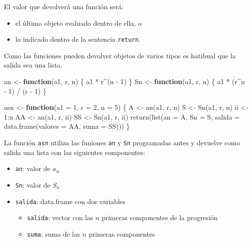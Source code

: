 \documentclass[
]{book}
\newenvironment{Shaded}{\begin{snugshade}}{\end{snugshade}}
\newcommand{\AttributeTok}[1]{\textcolor[rgb]{0.77,0.63,0.00}{#1}}
\newcommand{\ControlFlowTok}[1]{\textcolor[rgb]{0.13,0.29,0.53}{\textbf{#1}}}
\newcommand{\DecValTok}[1]{\textcolor[rgb]{0.00,0.00,0.81}{#1}}
\newcommand{\FunctionTok}[1]{\textcolor[rgb]{0.00,0.00,0.00}{#1}}
\newcommand{\NormalTok}[1]{#1}
\newcommand{\OtherTok}[1]{\textcolor[rgb]{0.56,0.35,0.01}{#1}}
\newcommand{\SpecialCharTok}[1]{\textcolor[rgb]{0.00,0.00,0.00}{#1}}
\providecommand{\tightlist}{%
  \setlength{\itemsep}{0pt}\setlength{\parskip}{0pt}}
\theoremstyle{break}
\begin{document}
El valor que devolverá una función será:

\begin{itemize}
\item
  el último objeto evaluado dentro de ella, o
\item
  lo indicado dentro de la sentencia \texttt{return}.
\end{itemize}

Como las funciones pueden devolver objetos de varios tipos es hatibual
que la salida sea una lista.

\begin{Shaded}
\begin{Highlighting}[]
\NormalTok{an }\OtherTok{\textless{}{-}} \ControlFlowTok{function}\NormalTok{(a1, r, n) \{ a1 }\SpecialCharTok{*}\NormalTok{ r}\SpecialCharTok{\^{}}\NormalTok{(n }\SpecialCharTok{{-}} \DecValTok{1}\NormalTok{) \}}
\NormalTok{Sn }\OtherTok{\textless{}{-}} \ControlFlowTok{function}\NormalTok{(a1, r, n) \{ a1 }\SpecialCharTok{*}\NormalTok{ (r}\SpecialCharTok{\^{}}\NormalTok{n }\SpecialCharTok{{-}} \DecValTok{1}\NormalTok{) }\SpecialCharTok{/}\NormalTok{ (r }\SpecialCharTok{{-}} \DecValTok{1}\NormalTok{) \}}
  
\NormalTok{asn }\OtherTok{\textless{}{-}} \ControlFlowTok{function}\NormalTok{(}\AttributeTok{a1 =} \DecValTok{1}\NormalTok{, }\AttributeTok{r =} \DecValTok{2}\NormalTok{, }\AttributeTok{n =} \DecValTok{5}\NormalTok{) \{}
\NormalTok{  A }\OtherTok{\textless{}{-}} \FunctionTok{an}\NormalTok{(a1, r, n)}
\NormalTok{  S }\OtherTok{\textless{}{-}} \FunctionTok{Sn}\NormalTok{(a1, r, n)}
\NormalTok{  ii }\OtherTok{\textless{}{-}} \DecValTok{1}\SpecialCharTok{:}\NormalTok{n}
\NormalTok{  AA }\OtherTok{\textless{}{-}} \FunctionTok{an}\NormalTok{(a1, r, ii)}
\NormalTok{  SS }\OtherTok{\textless{}{-}} \FunctionTok{Sn}\NormalTok{(a1, r, ii)}
  \FunctionTok{return}\NormalTok{(}\FunctionTok{list}\NormalTok{(}\AttributeTok{an =}\NormalTok{ A, }\AttributeTok{Sn =}\NormalTok{ S, }\AttributeTok{salida =} \FunctionTok{data.frame}\NormalTok{(}\AttributeTok{valores =}\NormalTok{ AA, }\AttributeTok{suma =}\NormalTok{ SS)))}
\NormalTok{\}}
\end{Highlighting}
\end{Shaded}

La función \texttt{asn} utiliza las funiones \texttt{an} y \texttt{Sn}
programadas antes y devuelve como salida una lista con las siguientes
componentes:

\begin{itemize}
\tightlist
\item
  \texttt{an}: valor de \(a_n\)
\item
  \texttt{Sn}: valor de \(S_n\)
\item
  \texttt{salida}: data.frame con dos variables

  \begin{itemize}
  \tightlist
  \item
    \texttt{salida}: vector con las \(n\) primeras componentes de la
    progresión
  \item
    \texttt{suma}: suma de las \(n\) primeras componentes
  \end{itemize}
\end{itemize}
\end{document}
